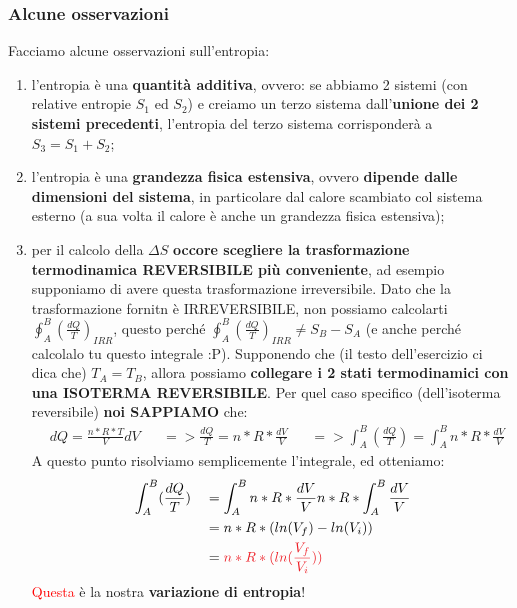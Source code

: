             \subsubsection{Alcune osservazioni}
                Facciamo alcune osservazioni sull'entropia:
                \begin{enumerate}
                    \item l'entropia è una \textbf{quantità additiva}, ovvero: se abbiamo 2 sistemi (con relative entropie $S_1$ ed $S_2$) e creiamo un terzo sistema dall'\textbf{unione dei 2 sistemi precedenti}, l'entropia del terzo sistema corrisponderà a $S_3 = S_1 + S_2$;
                    \item l'entropia è una \textbf{grandezza fisica estensiva}, ovvero \textbf{dipende dalle dimensioni del sistema}, in particolare dal calore scambiato col sistema esterno (a sua volta il calore è anche un grandezza fisica estensiva);
                    \item per il calcolo della $\Delta S$ \textbf{occore scegliere la trasformazione termodinamica REVERSIBILE più conveniente}, ad esempio supponiamo di avere questa trasformazione irreversibile.
                    Dato che la trasformazione fornitn è IRREVERSIBILE, non possiamo calcolarti $\oint_{A}^B(\frac{dQ}{T})_{IRR}$, questo perché $\oint_{A}^B(\frac{dQ}{T})_{IRR}\neq S_B-S_A$ (e anche perché calcolalo tu questo integrale :P). Supponendo che (il testo dell'esercizio ci dica che) $T_A = T_B$, allora possiamo \textbf{collegare i 2 stati termodinamici con una ISOTERMA REVERSIBILE}. Per quel caso specifico (dell'isoterma reversibile) \textbf{noi SAPPIAMO} che:
                    \begin{align*}
                        &dQ = \frac{n*R*T}{V}dV&&=>\frac{dQ}{T}=n*R*\frac{dV}{V}&&=> \int_A^B(\frac{dQ}{T}) = \int_A^Bn*R*\frac{dV}{V}
                    \end{align*}
                    A questo punto risolviamo semplicemente l'integrale, ed otteniamo:
                    \begin{align*}
                        &\int_A^B(\frac{dQ}{T}) &&= \int_A^Bn*R*\frac{dV}{V}n*R*\int_A^B\frac{dV}{V}\\
                         & && = n*R*(ln(V_f)-ln(V_i))\\
                         & && = \textcolor{Red}{n*R*(ln(\frac{V_f}{V_i}))}\\
                    \end{align*}
                    \textcolor{Red}{Questa} è la nostra \textbf{variazione di entropia}!
                \end{enumerate}

